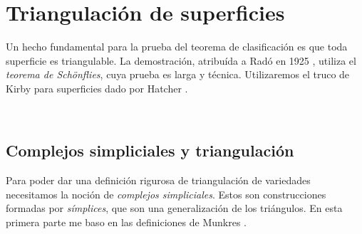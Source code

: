 \documentclass[10pt]{report}
\theoremstyle{definition}
\begin{document}


\chapter{Triangulación de superficies}

Un hecho fundamental para la prueba del teorema de clasificación es que toda superficie es triangulable. La demostración, atribuída a Radó en 1925 \cite{rado}, utiliza el \emph{teorema de Schönflies}, cuya prueba es larga y técnica. Utilizaremos el truco de Kirby para superficies dado por Hatcher \cite{hatcher_torus}.

\

\section{Complejos simpliciales y triangulación}\label{sec:simplices}

Para poder dar una definición rigurosa de triangulación de variedades necesitamos la noción de \textit{complejos simpliciales}. Estos son construcciones formadas por \textit{símplices}, que son una generalización de los triángulos. En esta primera parte me baso en las definiciones de Munkres \cite{munkres}.
\end{document}
